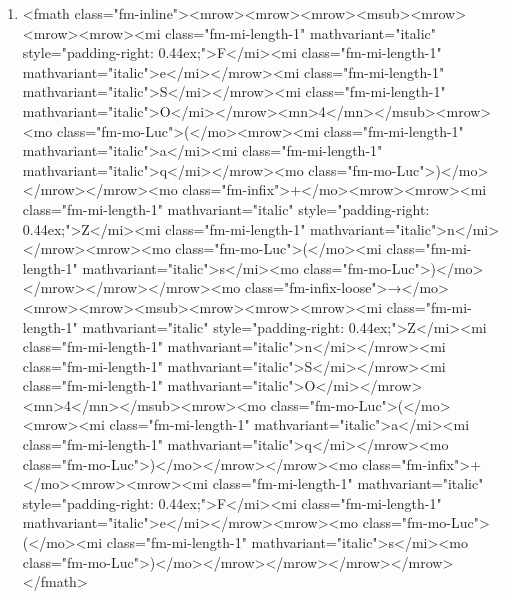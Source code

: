 \documentclass{article}
\begin{document}
\begin{enumerate}[label=(\alph*)]
\item  <fmath class="fm-inline"><mrow><mrow><mrow><msub><mrow><mrow><mrow><mi class="fm-mi-length-1" mathvariant="italic" style="padding-right: 0.44ex;">F</mi><mi class="fm-mi-length-1" mathvariant="italic">e</mi></mrow><mi class="fm-mi-length-1" mathvariant="italic">S</mi></mrow><mi class="fm-mi-length-1" mathvariant="italic">O</mi></mrow><mn>4</mn></msub><mrow><mo class="fm-mo-Luc">(</mo><mrow><mi class="fm-mi-length-1" mathvariant="italic">a</mi><mi class="fm-mi-length-1" mathvariant="italic">q</mi></mrow><mo class="fm-mo-Luc">)</mo></mrow></mrow><mo class="fm-infix">+</mo><mrow><mrow><mi class="fm-mi-length-1" mathvariant="italic" style="padding-right: 0.44ex;">Z</mi><mi class="fm-mi-length-1" mathvariant="italic">n</mi></mrow><mrow><mo class="fm-mo-Luc">(</mo><mi class="fm-mi-length-1" mathvariant="italic">s</mi><mo class="fm-mo-Luc">)</mo></mrow></mrow></mrow><mo class="fm-infix-loose">→</mo><mrow><mrow><msub><mrow><mrow><mrow><mi class="fm-mi-length-1" mathvariant="italic" style="padding-right: 0.44ex;">Z</mi><mi class="fm-mi-length-1" mathvariant="italic">n</mi></mrow><mi class="fm-mi-length-1" mathvariant="italic">S</mi></mrow><mi class="fm-mi-length-1" mathvariant="italic">O</mi></mrow><mn>4</mn></msub><mrow><mo class="fm-mo-Luc">(</mo><mrow><mi class="fm-mi-length-1" mathvariant="italic">a</mi><mi class="fm-mi-length-1" mathvariant="italic">q</mi></mrow><mo class="fm-mo-Luc">)</mo></mrow></mrow><mo class="fm-infix">+</mo><mrow><mrow><mi class="fm-mi-length-1" mathvariant="italic" style="padding-right: 0.44ex;">F</mi><mi class="fm-mi-length-1" mathvariant="italic">e</mi></mrow><mrow><mo class="fm-mo-Luc">(</mo><mi class="fm-mi-length-1" mathvariant="italic">s</mi><mo class="fm-mo-Luc">)</mo></mrow></mrow></mrow></mrow></fmath> 

\end{enumerate}
\end{document}
